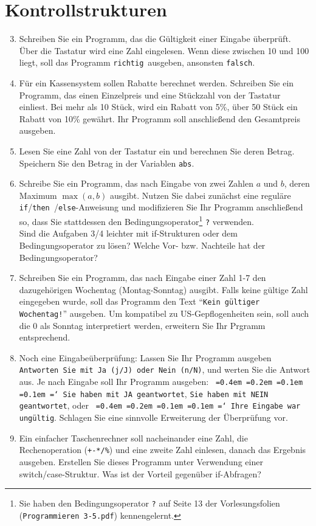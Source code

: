 \documentclass[paper=a4, fontsize=11pt, twoside]{scrartcl}
\newcommand*\justify{%
  \fontdimen2\font=0.4em%
  \fontdimen3\font=0.2em%
  \fontdimen4\font=0.1em%
  \fontdimen7\font=0.1em%
  \hyphenchar\font=`\-%
}
\begin{document}
\section*{Kontrollstrukturen}
\begin{enumerate}[resume]
\setcounter{enumi}{2}
  \item Schreiben Sie ein Programm, das die Gültigkeit einer Eingabe überprüft. Über die Tastatur wird eine Zahl eingelesen. Wenn diese zwischen 10 und 100 liegt, soll das Programm \glqq \texttt{richtig}\grqq\, ausgeben, ansonsten \glqq \texttt{falsch}\grqq.%
  \item Für ein Kassensystem sollen Rabatte berechnet werden. Schreiben Sie ein Programm, das einen Einzelpreis und eine Stückzahl von der Tastatur einliest. Bei mehr als 10 Stück, wird ein Rabatt von 5\%, über 50 Stück ein Rabatt von 10\% gewährt. Ihr Programm soll anschließend den Gesamtpreis ausgeben.
  \item Lesen Sie eine Zahl von der Tastatur ein und berechnen Sie deren Betrag. Speichern Sie den Betrag in der Variablen \texttt{abs}.
  \item Schreibe Sie ein Programm, das nach Eingabe von zwei Zahlen \(a\) und \(b\), deren Maximum \(\max(a,b)\) ausgibt. Nutzen Sie dabei zunächst eine reguläre \texttt{if}/\texttt{then }/\texttt{else}-Anweisung und modifizieren Sie Ihr Programm anschließend so, dass Sie stattdessen den Bedingungsoperator\footnote{Sie haben den Bedingungsoperator \texttt{?} auf Seite 13 der Vorlesungsfolien (\texttt{Programmieren 3-5.pdf}) kennengelernt.} \texttt{?} verwenden. \\
   Sind die Aufgaben 3/4 leichter mit if-Strukturen oder dem Bedingungsoperator zu lösen? Welche Vor- bzw. Nachteile hat der Bedingungsoperator?
  \item Schreiben Sie ein Programm, das nach Eingabe einer Zahl 1-7 den dazugehörigen Wochentag (Montag-Sonntag) ausgibt. Falls keine gültige Zahl eingegeben wurde, soll das Programm den Text ``\texttt{Kein gültiger Wochentag!}'' ausgeben. Um kompatibel zu US-Gepflogenheiten sein, soll auch die 0 als Sonntag interpretiert werden, erweitern Sie Ihr Prgramm entsprechend.
  \item Noch eine Eingabeüberprüfung: Lassen Sie Ihr Programm ausgeben \glqq \texttt{Antworten Sie mit Ja (j/J) oder Nein (n/N)}\grqq , und werten Sie die Antwort aus. Je nach Eingabe soll Ihr Programm ausgeben: \glqq \texttt{\justify Sie haben mit JA geantwortet}\grqq, \glqq \texttt{Sie haben mit NEIN geantwortet}\grqq, oder \glqq \texttt{\justify Ihre Eingabe war ungültig}\grqq. Schlagen Sie eine sinnvolle Erweiterung der Überprüfung vor.
  \item Ein einfacher Taschenrechner soll nacheinander eine Zahl, die Rechenoperation (\texttt{+-*/\%}) und eine zweite Zahl einlesen, danach das Ergebnis ausgeben. Erstellen Sie dieses Programm unter Verwendung einer switch/case-Struktur. Was ist der Vorteil gegenüber if-Abfragen?
  
\end{enumerate}
\end{document}
